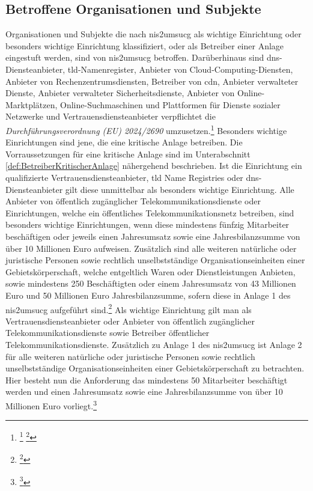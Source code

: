 \documentclass[11pt,a4paper,hidelinks]{article}   %
\begin{document}
        \subsection{Betroffene Organisationen und Subjekte}
        Organisationen und Subjekte die nach \gls{nis2umsucg} als wichtige Einrichtung oder besonders wichtige Einrichtung klassifiziert, oder als Betreiber einer Anlage eingestuft werden, sind von \gls{nis2umsucg} betroffen. Darüberhinaus sind \gls{dns}-Diensteanbieter, \gls{tld}-Namenregister, Anbieter von Cloud-Computing-Diensten, Anbieter von Rechenzent­rumsdiensten, Betreiber von \gls{cdn}, Anbieter verwalteter Dienste, Anbieter verwalteter Sicherheitsdienste, Anbieter von Online-Marktplätzen, Online-Suchmaschinen und Plattformen für Dienste sozialer Netzwerke und Vertrauensdiensteanbieter verpflichtet die \emph{Durchführungsverordnung (EU) 2024/2690} umzusetzen.\footnote{
            \footcite[Vgl. §30 Absatz 1, 2 \& 3,][]{NIS2UmsuCG}
            \footcite[Vgl. Absatz 1,][]{EU2024-2690}
        }\medbreak
        Besonders wichtige Einrichtungen sind jene, die eine kritische Anlage betreiben. Die Vorraussetzungen für eine kritische Anlage sind im Unterabschnitt \ref{def:BetreiberKritischerAnlage} nähergehend beschrieben. Ist die Einrichtung ein qualifizierte Vertrauensdiensteanbieter, \gls{tld} Name Registries oder \gls{dns}-Diensteanbieter gilt diese unmittelbar als besonders wichtige Einrichtung. Alle Anbieter von öffentlich zugänglicher Telekommunikationsdienste oder Einrichtungen, welche ein öffentliches Telekommunikationsnetz betreiben, sind besonders wichtige Einrichtungen, wenn diese mindestens fünfzig Mitarbeiter beschäftigen oder jeweils einen Jahresumsatz sowie eine Jahresbilanzsumme von über 10 Millionen Euro aufweisen. Zusätzlich sind alle weiteren natürliche oder juristische Personen sowie rechtlich unselbstständige Organisationseinheiten einer Gebietskörperschaft, welche entgeltlich Waren oder Dienstleistungen Anbieten, sowie mindestens 250 Beschäftigten oder einem Jahresumsatz von 43 Millionen Euro und 50 Millionen Euro Jahresbilanzsumme, sofern diese in Anlage 1 des \gls{nis2umsucg} aufgeführt sind.\footnote{
            \footcite[Vgl. §28 Absatz 1,][]{NIS2UmsuCG}
        }\medbreak
        Als wichtige Einrichtung gilt man als Vertrauensdiensteanbieter oder Anbieter von öffentlich zugänglicher Telekommunikationsdienste sowie Betreiber öffentlicher Telekommunikationsdienste. Zusätzlich zu Anlage 1 des \gls{nis2umsucg} ist Anlage 2 für alle weiteren natürliche oder juristische Personen sowie rechtlich unselbstständige Organisationseinheiten einer Gebietskörperschaft zu betrachten. Hier besteht nun die Anforderung das mindestens 50 Mitarbeiter beschäftigt werden und einen Jahresumsatz sowie eine Jahresbilanzsumme von über 10 Millionen Euro vorliegt.\footnote{
            \footcite[Vgl. §28 Absatz 2,][]{NIS2UmsuCG}
        }\medbreak
\end{document}
